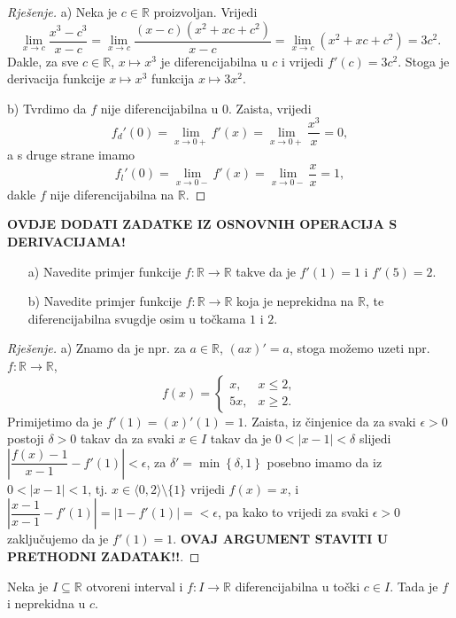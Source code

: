 \begin{proof}[Rješenje]
a) Neka je $c\in \mathbb{R}$ proizvoljan. Vrijedi
$$\lim\limits_{x\to c}{\dfrac{x^3-c^3}{x-c}}=\lim\limits_{x\to c}{\dfrac{(x-c)(x^2+xc+c^2)}{x-c}}=\lim\limits_{x\to c}{\left(x^2+xc+c^2\right)}=3c^2.$$
Dakle, za sve $c\in \mathbb{R}$, $x\mapsto x^3$ je diferencijabilna u $c$ i vrijedi $f'(c)=3c^2$. Stoga je derivacija funkcije $x\mapsto x^3$ funkcija $x\mapsto 3x^2$.

b) Tvrdimo da $f$ nije diferencijabilna u $0$. Zaista, vrijedi $$f_d'(0)=\lim\limits_{x\to 0+}{f'(x)}=\lim\limits_{x\to 0+}{\dfrac{x^3}{x}}=0,$$
a s druge strane imamo 
$$f_l'(0)=\lim\limits_{x\to 0-}{f'(x)}=\lim\limits_{x\to 0-}{\dfrac{x}{x}}=1,$$
dakle $f$ nije diferencijabilna na $\mathbb{R}$.
\end{proof}
\textbf{OVDJE DODATI ZADATKE IZ OSNOVNIH OPERACIJA S DERIVACIJAMA!}
\begin{exercise} \textbf{}
\begin{itemize}
\item[a)] Navedite primjer funkcije $f : \mathbb{R}\to \mathbb{R}$ takve da je $f'(1)=1$ i $f'(5)=2$.
\item[b)] Navedite primjer funkcije $f : \mathbb{R}\to \mathbb{R}$ koja je neprekidna na $\mathbb{R}$, te diferencijabilna svugdje osim u točkama $1$ i $2$.
\end{itemize}
\end{exercise}
\begin{proof}[Rješenje]
a) Znamo da je npr. za $a\in \mathbb{R}$, $\left(ax\right)'=a$, stoga možemo uzeti npr. $f : \mathbb{R}\to \mathbb{R}$,
$$f(x)=\begin{cases}
x, & x\leq 2,\\
5x, & x\geq 2.
\end{cases}$$
Primijetimo da je $f'(1)=(x)'(1)=1$. Zaista, iz činjenice da za svaki $\epsilon>0$ postoji $\delta>0$ takav da za svaki $x\in I$ takav da je $0<|x-1|<\delta$ slijedi $|\dfrac{f(x)-1}{x-1}-f'(1)|<\epsilon$, za $\delta'=\min\left\{\delta, 1\right\}$ posebno imamo da iz $0<|x-1|<1$, tj. $x\in \langle 0, 2\rangle\setminus\{1\}$ vrijedi $f(x)=x$, i $|\dfrac{x-1}{x-1}-f'(1)|=|1-f'(1)|=<\epsilon$, pa kako to vrijedi za svaki $\epsilon>0$ zaključujemo da je $f'(1)=1$. \textbf{OVAJ ARGUMENT STAVITI U PRETHODNI ZADATAK!!}.
\end{proof}
\begin{remark}
Neka je $I\subseteq \mathbb{R}$ otvoreni interval i $f : I \to \mathbb{R}$ diferencijabilna u točki $c\in I$. Tada je $f$ i neprekidna u $c$.
\end{remark}
